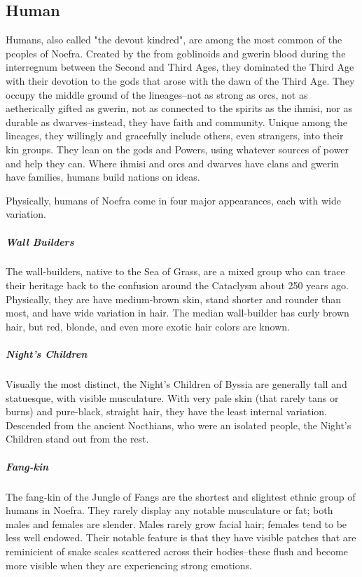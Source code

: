 \subsection{Human}\label{lineage:human}

Humans, also called "the devout kindred", are among the most common of the peoples of Noefra. Created by the  from goblinoids and gwerin blood during the interregnum between the Second and Third Ages, they dominated the Third Age with their devotion to the gods that arose with the dawn of the Third Age. They occupy the middle ground of the lineages--not as strong as orcs, not as aetherically gifted as gwerin, not as connected to the spirits as the ihmisi, nor as durable as dwarves--instead, they have faith and community. Unique among the lineages, they willingly and gracefully include others, even strangers, into their kin groups. They lean on the gods and Powers, using whatever sources of power and help they can. Where ihmisi and orcs and dwarves have clans and gwerin have families, humans build nations on ideas.

Physically, humans of Noefra come in four major appearances, each with wide variation.
\subparagraph*{Wall Builders} The wall-builders, native to the Sea of Grass, are a mixed group who can trace their heritage back to the confusion around the Cataclysm about 250 years ago. Physically, they are have medium-brown skin, stand shorter and rounder than most, and have wide variation in hair. The median wall-builder has curly brown hair, but red, blonde, and even more exotic hair colors are known.

\subparagraph*{Night's Children} Visually the most distinct, the Night's Children of Byssia are generally tall and statuesque, with visible musculature. With very pale skin (that rarely tans or burns) and pure-black, straight hair, they have the least internal variation. Descended from the ancient Nocthians, who were an isolated people, the Night's Children stand out from the rest.

\subparagraph*{Fang-kin} The fang-kin of the Jungle of Fangs are the shortest and slightest ethnic group of humans in Noefra. They rarely display any notable musculature or fat; both males and females are slender. Males rarely grow facial hair; females tend to be less well endowed. Their notable feature is that they have visible patches that are reminicient of snake scales scattered across their bodies--these flush and become more visible when they are experiencing strong emotions.


